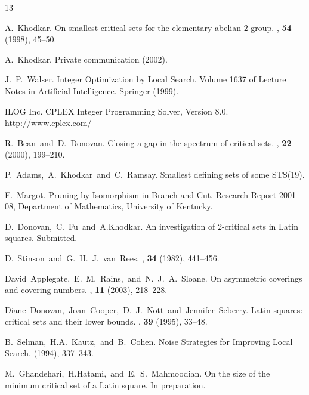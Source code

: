 \documentclass{article}
\begin{document}
\begin{thebibliography}{13}

A.~Khodkar.
\newblock On smallest critical sets for the elementary abelian $2$-group.
, {\bf 54} (1998), 45--50.

A.~Khodkar.
\newblock Private communication (2002).

J.~P.~Walser.
\newblock Integer Optimization by Local Search.
\newblock Volume 1637 of Lecture Notes in Artificial Intelligence. Springer (1999).

ILOG Inc.
\newblock CPLEX Integer Programming Solver, Version 8.0.
\newblock http://www.cplex.com/

R.~Bean~and~D.~Donovan.
\newblock Closing a gap in the spectrum of critical sets.
, {\bf 22} (2000), 199--210.

P.~Adams,~A.~Khodkar~and~C.~Ramsay.
\newblock Smallest defining sets of some STS(19).

F.~Margot.
\newblock Pruning by Isomorphism in Branch-and-Cut.
\newblock Research Report 2001-08, Department of Mathematics, University of Kentucky.

D.~Donovan,~C.~Fu~and~A.Khodkar.
\newblock An investigation of 2-critical sets in Latin squares.
\newblock Submitted.


D.~Stinson~and~G.~H.~J.~van~Rees.
, {\bf 34} (1982), 441--456.

David~Applegate,~E.~M.~Rains,~and~N.~J.~A.~Sloane.
\newblock On asymmetric coverings and covering numbers.
, {\bf 11} (2003),
218--228.

Diane~Donovan,~Joan~Cooper,~D.~J.~Nott~and~Jennifer~Seberry.
\newblock Latin squares: critical sets and their lower bounds.
, {\bf 39} (1995), 33--48.

B.~Selman,~H.A.~Kautz,~and~B.~Cohen.
\newblock Noise Strategies for Improving Local Search.
 (1994), 337--343.

M.~Ghandehari,~H.Hatami,~and~E.~S.~Mahmoodian.
\newblock On the size of the minimum critical set of a Latin
square.
\newblock In preparation.
\end{thebibliography}
\end{document}

